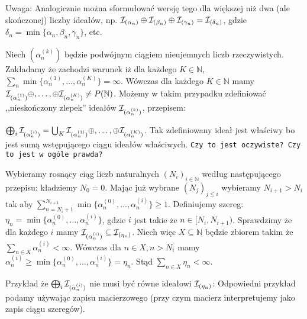 \documentclass[12pt]{article}
\theoremstyle{plain}
\theoremstyle{definition}
\theoremstyle{remark}
\newcommand{\nnatural}{\mathbb{N}}
\newcommand{\cI}{{\cal I}}
\newcommand{\todo}[1]{{\tt #1}}
\begin{document}
Uwaga: Analogicznie można sformułować wersję tego dla większej
niż dwa (ale skończonej) liczby ideałów, np. 
$\cI_{(\alpha_n)} \oplus \cI_{(\beta_n)} \oplus \cI_{(\gamma_n)} = \cI_{(\delta_n)}$,
gdzie $\delta_n = \min\{\alpha_n,\beta_n, \gamma_n\}$, etc.

Niech $(\alpha_n^{(k)})$ będzie podwójnym ciągiem nieujemnych liczb
rzeczywistych. Zakładamy że zachodzi warunek
iż dla każdego $K \in \nnatural$, 
$\sum_n \min \{\alpha_n^{(1)}, \ldots, \alpha_n^{(K)}\} = \infty$.
Wówczas dla każdego $K \in \nnatural$ mamy
$\cI_{(\alpha_n^{(1)})} \oplus,\ldots,\oplus \cI_{(\alpha_n^{(K)})} \not= P(\nnatural)$.
Możemy w takim przypadku zdefiniować ,,nieskończony zlepek'' ideałów 
$\cI_{(\alpha_n^{(k)})}$, przepisem:			 
	
$\bigoplus_{i}\cI_{(\alpha_n^{(i)})} = \bigcup_{K} \cI_{(\alpha_n^{(1)})} \oplus,\ldots,\oplus \cI_{(\alpha_n^{(K)})}$.
Tak zdefiniowany ideał jest właściwy bo jest sumą wstępującego ciągu ideałów właściwych.
\todo{Czy to jest oczywiste? Czy to jest w ogóle prawda?}

Wybieramy rosnący ciąg liczb naturalnych $(N_i)_{i\in\nnatural}$ według następującego przepisu: kładziemy $N_0 = 0$. Mając już wybrane $(N_j)_{j \leq i}$
wybieramy $N_{i + 1} > N_{i}$ tak aby $\sum_{n = N_{i} + 1}^{N_{i+1}} \min\{\alpha_n^{(0)} , \ldots, \alpha_n^{(i)} \} \geq 1$.
Definiujemy szereg: $\eta_n = \min\{\alpha_n^{(0)} , \ldots, \alpha_n^{(i)}\}$, gdzie $i$ jest
takie że $n \in [N_i, N_{i+1})$. Sprawdzimy że dla każdego $i$ mamy 
$\cI_{(\alpha_n^{(i)})} \subseteq \cI_{(\eta_n)}$.				
Niech więc $X \subseteq \nnatural$ będzie zbiorem takim że 
$\sum_{n\in X} \alpha_n^{(i)} < \infty$. Wówczas dla $n\in X, n > N_i$ mamy
$\alpha_n^{(i)} \geq \min\{\alpha_n^{(0)} , \ldots, \alpha_n^{(i)}\} = \eta_n$.
Stąd $\sum_{n\in X}\eta_n < \infty$.

Przykład że $\bigoplus_{i}\cI_{(\alpha_n^{(i)})}$ nie musi być
równe ideałowi $\cI_{(\eta_n)}$: 
Odpowiedni przykład podamy używając zapisu macierzowego
(przy czym macierz interpretujemy jako zapis ciągu szeregów).
	
\end{document}
